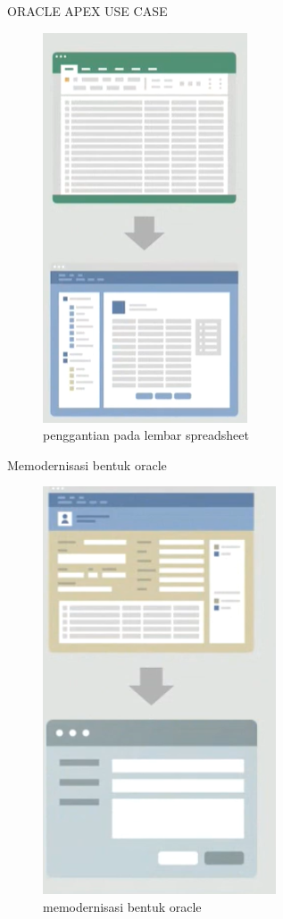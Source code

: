 ORACLE APEX USE CASE
  \begin{figure}[!htbp]
    \centering
    \includegraphics[scale=1]{section/1.PNG}
    \caption{penggantian pada lembar spreadsheet}
    \label{gambar 1}
\end{figure}
 
 Memodernisasi bentuk oracle
  \begin{figure}[!htbp]
    \centering
    
    \includegraphics[scale=1]{section/2.PNG}
    \caption{memodernisasi bentuk oracle}
    \label{gambar 1}
\end{figure}
 